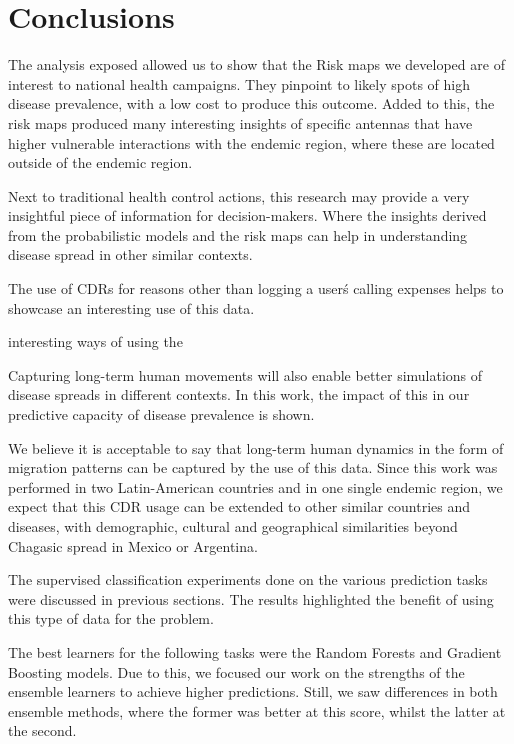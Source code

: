 \chapter{Conclusions}\label{ch:conclusions}


The analysis exposed allowed us to show that the Risk maps we developed are of interest to national health campaigns.
They pinpoint to likely spots of high disease prevalence, with a low cost to produce this outcome.
Added to this, the risk maps produced many interesting insights of specific antennas that have higher vulnerable interactions with the endemic region, where these are located outside of the endemic region.

Next to traditional health control actions, this research may provide a very insightful piece of information for decision-makers.
Where the insights derived from the probabilistic models and the risk maps can help in understanding disease spread in other similar contexts.


The use of CDRs for reasons other than logging a user\'s calling expenses helps to showcase an interesting use of this data.

interesting ways of using the

Capturing long-term human movements will also enable better simulations of disease spreads in different contexts.
In this work, the impact of this in our predictive capacity of disease prevalence is shown.


We believe it is acceptable to say that long-term human dynamics in the form of migration patterns can be captured by the use of this data.
Since this work was performed in two Latin-American countries and in one single endemic region, we expect that this CDR usage can be extended to other similar countries and diseases, with demographic, cultural and geographical similarities beyond Chagasic spread in Mexico or Argentina.



The supervised classification experiments done on the various prediction tasks were discussed in previous sections.
The results highlighted the benefit of using this type of data for the problem.


The best learners for the following tasks were the Random Forests and Gradient Boosting models.
Due to this, we focused our work on the strengths of the ensemble learners to achieve higher predictions.
Still, we saw differences in both ensemble methods, where the former was better at this score, whilst the latter at the second.


